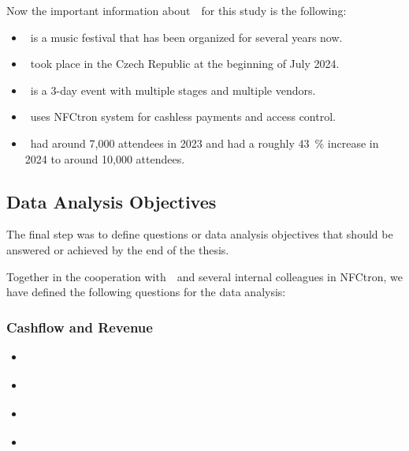 Now the important information about~\theEvent~for this study is the following:
\begin{itemize}
	\item \theEvent~is a music festival that has been organized for several years now.
	\item \theEvent~took place in the Czech Republic at the beginning of July 2024.
	\item \theEvent~is a 3-day event with multiple stages and multiple vendors.
	\item \theEvent~uses NFCtron system for cashless payments and access control.
	\item \theEvent~had around 7,000 attendees in 2023 and had a roughly 43~\% increase in 2024 to around 10,000 attendees.
\end{itemize}

\subsection*{Data Analysis Objectives}
\label{subsec:introduction-objectives-data-analysis}

The final step was to define questions or data analysis objectives that should be answered or achieved by the end of the thesis.

Together in the cooperation with~\theOrganizer~and several internal colleagues in NFCtron, we have defined the following questions for the data analysis:

\subsubsection*{Cashflow and Revenue}
\begin{flushleft}
	\begin{itemize}
		\item \textit{}
		\item \textit{}
		\item \textit{}
		\item \textit{}
	\end{itemize}
\end{flushleft}

